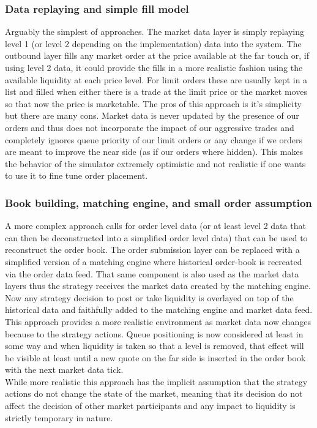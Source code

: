 \subsubsection{Data replaying and simple fill model}
Arguably the simplest of approaches. The market data layer is simply replaying level 1 (or level 2 depending on the implementation) data into the system. The outbound layer fills any market order at the price available at the far touch or, if using level 2 data, it could provide the fills in a more realistic fashion using the available liquidity at each price level. For limit orders these are usually kept in a list and filled when either there is a trade at the limit price or the market moves so that now the price is marketable. The pros of this approach is it's simplicity but there are many cons. Market data is never updated by the presence of our orders and thus does not incorporate the impact of our aggressive trades and completely ignores queue priority of our limit orders or any change if we orders are meant to improve the near side (as if our orders where hidden). This makes the behavior of the simulator extremely optimistic and not realistic if one wants to use it to fine tune order placement.

\subsubsection{Book building, matching engine, and small order assumption}
A more complex approach calls for order level data (or at least level 2 data that can then be deconstructed into a simplified order level data) that can be used to reconstruct the order book. The order submission layer can be replaced with a simplified version of a matching engine where historical order-book is recreated via the order data feed. That same component is also used as the market data layers thus the strategy receives the market data created by the matching engine. Now any strategy decision to post or take liquidity is overlayed on top of the historical data and faithfully added to the matching engine and market data feed. This approach provides a more realistic environment as market data now changes because to the strategy actions. Queue positioning is now considered at least in some way and when liquidity is taken so that a level is removed, that effect will be visible at least until a new quote on the far side is inserted in the order book with the next market data tick. \\

While more realistic this approach has the implicit assumption that the strategy actions do not change the state of the market, meaning that its decision do not affect the decision of other market participants and any impact to liquidity is strictly temporary in nature. 

